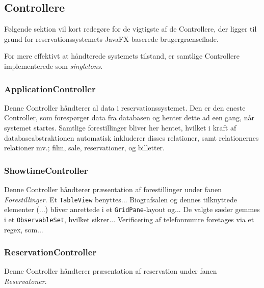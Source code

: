 \subsection{Controllere}

Følgende sektion vil kort redegøre for de vigtigste af de Controllere, der ligger til grund for reservationssystemets JavaFX-baserede brugergrænseflade.

For mere effektivt at håndterede systemets tilstand, er samtlige Controllere implementerede som \textit{singletons}.

\subsubsection{ApplicationController}

Denne Controller håndterer al data i reservationssystemet. Den er den eneste Controller, som forespørger data fra databasen og henter dette ad een gang, når systemet startes. Samtlige forestillinger bliver her hentet, hvilket i kraft af databaseabstraktionen automatisk inkluderer disses relationer, samt relationernes relationer mv.; film, sale, reservationer, og billetter.

\subsubsection{ShowtimeController}

Denne Controller håndterer præsentation af forestillinger under fanen \textit{Forestillinger}. Et \texttt{TableView} benyttes... Biografsalen og dennes tilknyttede elementer (...) bliver anrettede i et \texttt{GridPane}-layout og... De valgte sæder gemmes i et \texttt{ObservableSet}, hvilket sikrer... Verificering af telefonnumre foretages via et regex, som... 
  
\subsubsection{ReservationController}

Denne Controller håndterer præsentation af reservation under fanen \textit{Reservatoner}.

